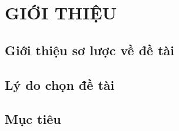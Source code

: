 \documentclass[a4paper,12pt]{report}
\begin{document}


\tableofcontents
\newpage



\newpage

\chapter{GIỚI THIỆU}
\section{Giới thiệu sơ lược về đề tài}



\section{Lý do chọn đề tài}



\section{Mục tiêu}

\end{document}
